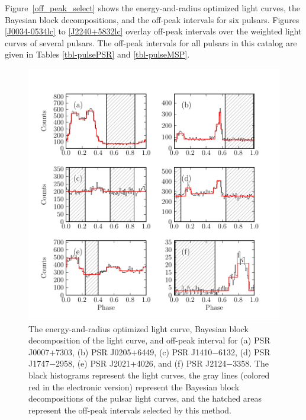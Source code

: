 Figure~\ref{off_peak_select} shows the energy-and-radius optimized
light curves, the Bayesian block decompositions, 
and the off-peak intervals for six pulsars.  
Figures \ref{J0034-0534lc} to \ref{J2240+5832lc} overlay off-peak intervals
over the weighted light curves of several pulsars.
The off-peak
intervals for all pulsars in this catalog are given in Tables \ref{tbl-pulsePSR} and \ref{tbl-pulseMSP}.

\begin{figure}
  \includegraphics{chapters/offpeak/figures/off_peak_phase_color.pdf}
  \caption{The energy-and-radius optimized light curve, Bayesian block decomposition of the        
  light curve, and off-peak interval for
  (a) PSR J0007+7303, (b) PSR J0205+6449, (c) PSR J1410$-$6132,
  (d) PSR J1747$-$2958, (e) PSR J2021+4026, and (f) PSR J2124$-$3358.
  The black histograms represent the light curves,
  the gray lines (colored red in the electronic version)
  represent the Bayesian block decompositions of the pulsar light curves, and
  the hatched areas represent the off-peak intervals selected by this method.}
\end{figure}

